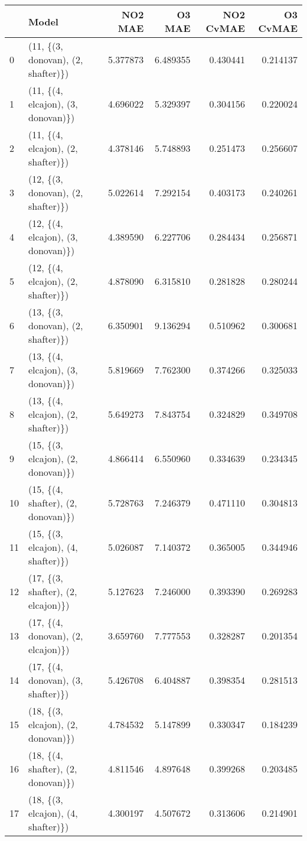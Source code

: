 \begin{tabular}{llrrrr}
\toprule
{} &                               Model &   NO2 MAE &    O3 MAE &  NO2 CvMAE &  O3 CvMAE \\
\midrule
0  &  (11, \{(3, donovan), (2, shafter)\}) &  5.377873 &  6.489355 &   0.430441 &  0.214137 \\
1  &  (11, \{(4, elcajon), (3, donovan)\}) &  4.696022 &  5.329397 &   0.304156 &  0.220024 \\
2  &  (11, \{(4, elcajon), (2, shafter)\}) &  4.378146 &  5.748893 &   0.251473 &  0.256607 \\
3  &  (12, \{(3, donovan), (2, shafter)\}) &  5.022614 &  7.292154 &   0.403173 &  0.240261 \\
4  &  (12, \{(4, elcajon), (3, donovan)\}) &  4.389590 &  6.227706 &   0.284434 &  0.256871 \\
5  &  (12, \{(4, elcajon), (2, shafter)\}) &  4.878090 &  6.315810 &   0.281828 &  0.280244 \\
6  &  (13, \{(3, donovan), (2, shafter)\}) &  6.350901 &  9.136294 &   0.510962 &  0.300681 \\
7  &  (13, \{(4, elcajon), (3, donovan)\}) &  5.819669 &  7.762300 &   0.374266 &  0.325033 \\
8  &  (13, \{(4, elcajon), (2, shafter)\}) &  5.649273 &  7.843754 &   0.324829 &  0.349708 \\
9  &  (15, \{(3, elcajon), (2, donovan)\}) &  4.866414 &  6.550960 &   0.334639 &  0.234345 \\
10 &  (15, \{(4, shafter), (2, donovan)\}) &  5.728763 &  7.246379 &   0.471110 &  0.304813 \\
11 &  (15, \{(3, elcajon), (4, shafter)\}) &  5.026087 &  7.140372 &   0.365005 &  0.344946 \\
12 &  (17, \{(3, shafter), (2, elcajon)\}) &  5.127623 &  7.246000 &   0.393390 &  0.269283 \\
13 &  (17, \{(4, donovan), (2, elcajon)\}) &  3.659760 &  7.777553 &   0.328287 &  0.201354 \\
14 &  (17, \{(4, donovan), (3, shafter)\}) &  5.426708 &  6.404887 &   0.398354 &  0.281513 \\
15 &  (18, \{(3, elcajon), (2, donovan)\}) &  4.784532 &  5.147899 &   0.330347 &  0.184239 \\
16 &  (18, \{(4, shafter), (2, donovan)\}) &  4.811546 &  4.897648 &   0.399268 &  0.203485 \\
17 &  (18, \{(3, elcajon), (4, shafter)\}) &  4.300197 &  4.507672 &   0.313606 &  0.214901 \\

\end{tabular}
